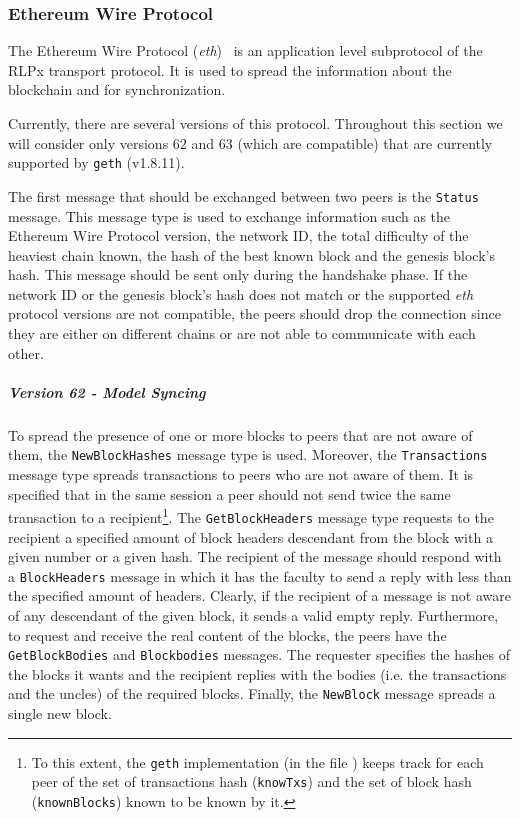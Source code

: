 \subsubsection{Ethereum Wire Protocol}
\label{sec:ethereum-wire-protocol}

The Ethereum Wire Protocol (\emph{eth})~\cite{bib:ethereumwireprotocol} is an
application level subprotocol of the RLPx transport protocol. It is used to
spread the information about the blockchain and for synchronization.

Currently, there are several versions of this protocol. Throughout this section
we will consider only versions $62$ and $63$ (which are compatible) that are
currently supported by \texttt{geth} (v1.8.11).

The first message that should be exchanged between two peers is the
\texttt{Status} message. This message type is used to exchange information such
as the Ethereum Wire Protocol version, the network ID, the total difficulty of
the heaviest chain known, the hash of the best known block and the genesis
block's hash. This message should be sent only during the handshake phase. If
the network ID or the genesis block's hash does not match or the supported
\emph{eth} protocol versions are not compatible, the peers should drop the
connection since they are either on different chains or are not able to
communicate with each other.

\subparagraph{Version 62 - Model Syncing}
\label{sec:normal-sync}
To spread the presence of one or more blocks to peers that are not aware of
them, the \texttt{NewBlockHashes} message type is used. Moreover, the
\texttt{Transactions} message type spreads transactions to peers who are not
aware of them. It is specified that in the same session a peer should not send
twice the same transaction to a recipient\footnote{To this extent, the
\texttt{geth} implementation (in the file ) keeps track for
each peer of the set of transactions hash (\texttt{knowTxs}) and the set of
block hash (\texttt{knownBlocks}) known to be known by it.}. The
\texttt{GetBlockHeaders} message type requests to the recipient a specified
amount of block headers descendant from the block with a given number or a given
hash. The recipient of the message should respond with a \texttt{BlockHeaders}
message in which it has the faculty to send a reply with less than the specified
amount of headers. Clearly, if the recipient of a message is not aware of any
descendant of the given block, it sends a valid empty reply. Furthermore, to
request and receive the real content of the blocks, the peers have the
\texttt{GetBlockBodies} and \texttt{Blockbodies} messages. The requester
specifies the hashes of the blocks it wants and the recipient replies with the
bodies (i.e. the transactions and the uncles) of the required blocks. Finally,
the \texttt{NewBlock} message spreads a single new block.

